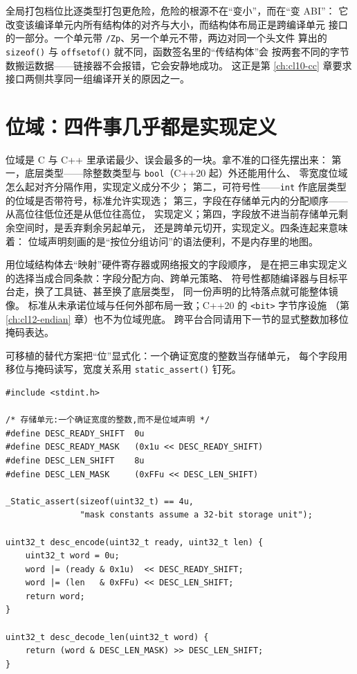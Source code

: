 \documentclass[12pt,a4paper,fontset=fandol]{ctexbook}
\newcommand{\cpp}[1]{C++#1}
\newcommand{\Fn}[1]{\texttt{#1()}}
\newcommand{\Tp}[1]{\texttt{#1}}
\newcommand{\Sw}[1]{\texttt{#1}}
\begin{document}
全局打包档位比逐类型打包更危险，危险的根源不在“变小”，而在“变 ABI”：
它改变该编译单元内所有结构体的对齐与大小，而结构体布局正是跨编译单元
接口的一部分。一个单元带 \Sw{/Zp}、另一个单元不带，两边对同一个头文件
算出的 \Fn{sizeof} 与 \Fn{offsetof} 就不同，函数签名里的“传结构体”会
按两套不同的字节数搬运数据——链接器不会报错，它会安静地成功。
这正是第 \ref{ch:cl10-cc} 章要求接口两侧共享同一组编译开关的原因之一。

\section{位域：四件事几乎都是实现定义}\label{sec:cl11-bitfields}

位域是 C 与 C++ 里承诺最少、误会最多的一块。拿不准的口径先摆出来：
第一，底层类型——除整数类型与 \Tp{bool}（\cpp{20} 起）外还能用什么、
零宽度位域怎么起对齐分隔作用，实现定义成分不少；
第二，可符号性——\Tp{int} 作底层类型的位域是否带符号，标准允许实现选；
第三，字段在存储单元内的分配顺序——从高位往低位还是从低位往高位，
实现定义；第四，字段放不进当前存储单元剩余空间时，是丢弃剩余另起单元，
还是跨单元切开，实现定义。四条连起来意味着：
位域声明刻画的是“按位分组访问”的语法便利，不是内存里的地图。

\begin{warning}[title={位域布局不是协议格式}]
用位域结构体去“映射”硬件寄存器或网络报文的字段顺序，
是在把三串实现定义的选择当成合同条款：字段分配方向、跨单元策略、
符号性都随编译器与目标平台走，换了工具链、甚至换了底层类型，
同一份声明的比特落点就可能整体镜像。
标准从未承诺位域与任何外部布局一致；\cpp{20} 的 \Tp{<bit>} 字节序设施
（第 \ref{ch:cl12-endian} 章）也不为位域兜底。
跨平台合同请用下一节的显式整数加移位掩码表达。
\end{warning}

可移植的替代方案把“位”显式化：一个确证宽度的整数当存储单元，
每个字段用移位与掩码读写，宽度关系用 \Fn{static\_assert} 钉死。

\begin{lstlisting}[style=cstyle, caption={显式整数与移位掩码：位布局自己写死（C11）}]
#include <stdint.h>

/* 存储单元:一个确证宽度的整数,而不是位域声明 */
#define DESC_READY_SHIFT  0u
#define DESC_READY_MASK   (0x1u << DESC_READY_SHIFT)
#define DESC_LEN_SHIFT    8u
#define DESC_LEN_MASK     (0xFFu << DESC_LEN_SHIFT)

_Static_assert(sizeof(uint32_t) == 4u,
               "mask constants assume a 32-bit storage unit");

uint32_t desc_encode(uint32_t ready, uint32_t len) {
    uint32_t word = 0u;
    word |= (ready & 0x1u)  << DESC_READY_SHIFT;
    word |= (len   & 0xFFu) << DESC_LEN_SHIFT;
    return word;
}

uint32_t desc_decode_len(uint32_t word) {
    return (word & DESC_LEN_MASK) >> DESC_LEN_SHIFT;
}
\end{lstlisting}
\end{document}
